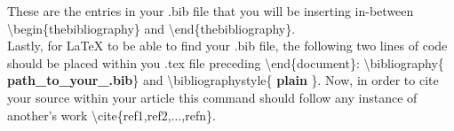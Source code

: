 These are the entries in your .bib file that you will be inserting
in-between \textbackslash{begin}\{thebibliography\} and 
\textbackslash{end}\{thebibliography\}. \\
Lastly, for \LaTeX{} to be able to find your .bib file, 
the following two lines of code 
should be placed within you .tex file preceding \textbackslash{end}\{document\}:
\textbackslash{bibliography}\{ \textbf{path\_to\_your\_.bib}\} and
\textbackslash{bibliographystyle}\{ \textbf{plain} \}. 
Now, in order to cite your source within your article this command should follow
any instance of another's work \textbackslash{cite}\{ref1,ref2,$\dots$,refn\}.




%

%





